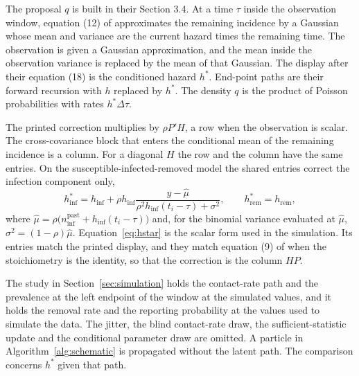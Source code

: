 The proposal \(q\) is built in their Section 3.4. At a time \(\tau\) inside the observation window, equation (12) of \citet{whitaker2025} approximates the remaining incidence by a Gaussian whose mean and variance are the current hazard times the remaining time. The observation is given a Gaussian approximation, and the mean inside the observation variance is replaced by the mean of that Gaussian. The display after their equation (18) is the conditioned hazard \(h^{*}\). End-point paths are their forward recursion with \(h\) replaced by \(h^{*}\). The density \(q\) is the product of Poisson probabilities with rates \(h^{*}\Delta\tau\).

The printed correction multiplies by \(\rho P' H\), a row when the observation is scalar. The cross-covariance block that enters the conditional mean of the remaining incidence is a column. For a diagonal \(H\) the row and the column have the same entries. On the susceptible-infected-removed model the shared entries correct the infection component only,
\begin{equation}
\label{eq:hstar}
h^{*}_{\mathrm{inf}}
= h_{\mathrm{inf}}
+ \rho h_{\mathrm{inf}}
\frac{y - \hat{\mu}}{\rho^{2} h_{\mathrm{inf}}(t_i - \tau) + \sigma^{2}},
\qquad
h^{*}_{\mathrm{rem}} = h_{\mathrm{rem}},
\end{equation}
where \(\hat{\mu} = \rho\bigl(n^{\mathrm{past}}_{\mathrm{inf}} + h_{\mathrm{inf}}(t_i - \tau)\bigr)\) and, for the binomial variance evaluated at \(\hat{\mu}\), \(\sigma^{2} = (1-\rho)\hat{\mu}\). Equation~\eqref{eq:hstar} is the scalar form used in the simulation. Its entries match the printed display, and they match equation (9) of \citet{golightly2015} when the stoichiometry is the identity, so that the correction is the column \(HP\).

The study in Section~\ref{sec:simulation} holds the contact-rate path and the prevalence at the left endpoint of the window at the simulated values, and it holds the removal rate and the reporting probability at the values used to simulate the data. The jitter, the blind contact-rate draw, the sufficient-statistic update and the conditional parameter draw are omitted. A particle in Algorithm~\ref{alg:schematic} is propagated without the latent path. The comparison concerns \(h^{*}\) given that path.
